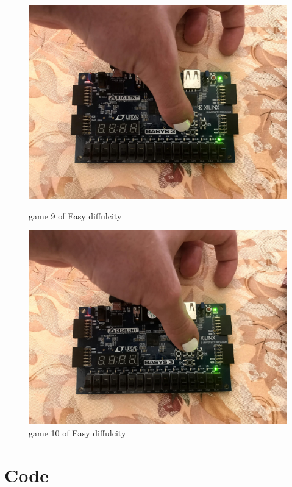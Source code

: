 \documentclass[11pt]{article}
\begin{document}
\begin{figure}[ht]
	\includegraphics{IMG_1319.JPG}
	\caption{game 9 of Easy diffulcity }
	\label{fig:sim_with_table}
	
	\includegraphics{IMG_1320.JPG}
	\caption{game 10 of Easy diffulcity }
	\label{fig:sim_with_table}
\end{figure}


\clearpage
\section*{Code}
\end{document}
